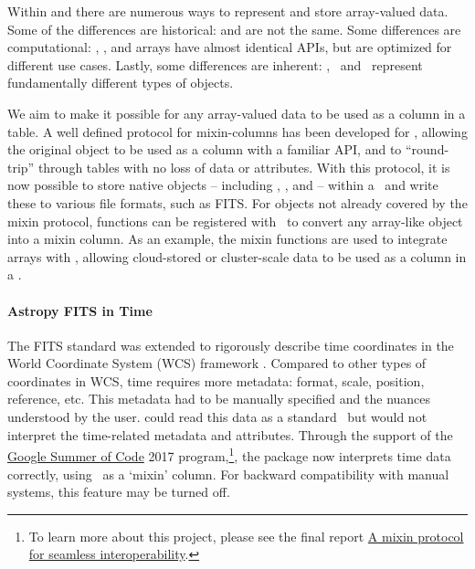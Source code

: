 \documentclass[modern]{aastex631}
\begin{document}
Within \astropypkg and \python there are numerous ways to represent and store
array-valued data. Some of the differences are historical:
 and
 are not the same. Some
differences are computational: , , and
 arrays have almost identical APIs, but are optimized for
different use cases. Lastly, some differences are inherent: \astropyQuantity,
\astropyTime\, and \astropySkyCoord\ represent fundamentally different types of
objects.

We aim to make it possible for any array-valued data to be used as a column in a
table. A well defined protocol for mixin-columns has been developed for
\astropytable, allowing the original object to be used as a column with a
familiar API, and to ``round-trip'' through tables with no loss of data or
attributes. With this protocol, it is now possible to store \astropy native
objects -- including \astropyTime, \astropyQuantity, and \astropySkyCoord --
within a \astropyTable\ and write these to various file formats, such as FITS.
For objects not already covered by the mixin protocol, functions can be
registered with \astropyTable\ to convert any array-like object into a mixin
column. As an example, the mixin functions are used to integrate 
arrays with \astropyTable, allowing cloud-stored or cluster-scale data to be
used as a column in a \astropyTable.

\paragraph{Astropy FITS in Time}

The FITS standard was extended to rigorously describe time coordinates in the
World Coordinate System (WCS) framework \citep{FITS-Time:2015}. Compared to
other types of coordinates in WCS, time requires more metadata: format, scale,
position, reference, etc. This metadata had to be manually specified and the
nuances understood by the user. \astropyfits could read this data as a standard
\astropyFitsColumn\, but would not interpret the time-related metadata and
attributes. Through the support of the
\href{https://summerofcode.withgoogle.com/archive/2017/projects/4778482366152704}{Google
Summer of Code} 2017 program,\footnote{ To learn more about this project, please
see the final report
\href{https://aaryapatil.wordpress.com/2017/08/28/a-mixin-protocol-for-seamless-interoperability/}{A
mixin protocol for seamless interoperability}.}, the \astropyfits package now
interprets time data correctly, using \astropyTime\ as a `mixin' column. For
backward compatibility with manual systems, this feature may be turned off.
\end{document}
